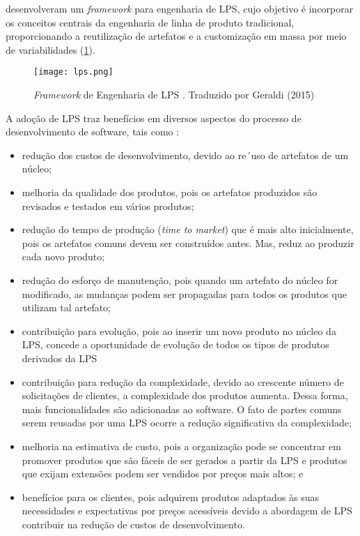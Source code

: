 \cite{pohl2005software} desenvolveram um \textit{framework} para engenharia de LPS, cujo objetivo é incorporar os conceitos centrais da engenharia de linha de produto tradicional, proporcionando a reutilização de artefatos e a customização em massa por meio de variabilidades (\ref{fig:lps}).

\begin{figure}[htb]
	\centering
	\texttt{[image: lps.png]}
	\caption{\textit{Framework} de Engenharia de LPS \cite{pohl2005software}. Traduzido por Geraldi (2015)}
	\label{fig:lps}
\end{figure}
\newpage
A adoção de LPS traz benefícios em diversos aspectos do processo de desenvolvimento de software, tais como \cite{linden2007product, pohl2005software}:

\begin{itemize}
	\item redução dos custos de desenvolvimento, devido ao re´uso de artefatos de um núcleo;
	\item melhoria da qualidade dos produtos, pois os artefatos produzidos são revisados e testados em vários produtos;
	\item redução do tempo de produção (\textit{time to market}) que é mais alto inicialmente, pois os artefatos comuns devem ser construídos antes. Mas, reduz ao produzir cada novo produto;
	\item redução do esforço de manutenção, pois quando um artefato do núcleo for modificado, as mudanças podem ser propagadas para todos os produtos que utilizam tal artefato;
	\item  contribuição para evolução, pois ao inserir um novo produto no núcleo da LPS, concede a oportunidade de evolução de todos os tipos de produtos derivados da LPS
	\item  contribuição para redução da complexidade, devido ao crescente número de solicitações de clientes, a complexidade dos produtos aumenta. Dessa forma, mais funcionalidades são adicionadas ao software. O fato de partes comuns serem
	reusadas por uma LPS ocorre a redução significativa da complexidade;
	\item melhoria na estimativa de custo, pois a organização pode se concentrar em promover produtos que são fáceis de ser gerados a partir da LPS e produtos que exijam extensões podem ser vendidos por preços mais altos; e 
	\item benefícios para os clientes, pois adquirem produtos adaptados às suas necessidades e expectativas por preços acessíveis devido a abordagem de LPS contribuir na redução
	de custos de desenvolvimento.
\end{itemize}

